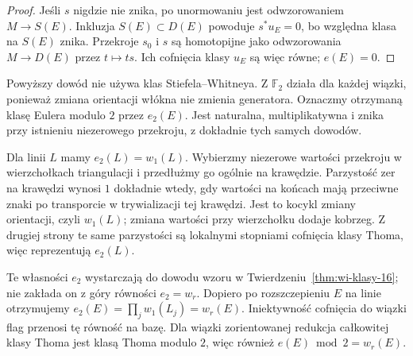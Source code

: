 \begin{proof}
Jeśli $s$ nigdzie
nie znika, po unormowaniu
jest odwzorowaniem
$M\to S(E)$.
Inkluzja $S(E)\subset D(E)$
powoduje $s^*u_E=0$,
bo względna klasa
na $S(E)$ znika.
Przekroje $s_0$ i $s$
są homotopijne jako
odwzorowania $M\to D(E)$
przez $t\mapsto ts$.
Ich cofnięcia klasy
$u_E$ są więc równe;
$e(E)=0$.
\end{proof}

\begin{uwaga}
Powyższy dowód nie używa klas Stiefela--Whitneya.
Z $\mathbb F_2$ działa dla każdej wiązki, ponieważ
zmiana orientacji włókna nie zmienia generatora.
Oznaczmy otrzymaną klasę Eulera modulo $2$ przez $e_2(E)$.
Jest naturalna, multiplikatywna i znika przy istnieniu
niezerowego przekroju, z dokładnie tych samych dowodów.

Dla linii $L$ mamy $e_2(L)=w_1(L)$. Wybierzmy
niezerowe wartości przekroju w wierzchołkach triangulacji
i przedłużmy go ogólnie na krawędzie. Parzystość zer
na krawędzi wynosi $1$ dokładnie wtedy, gdy wartości
na końcach mają przeciwne znaki po transporcie
w trywializacji tej krawędzi. Jest to kocykl zmiany
orientacji, czyli $w_1(L)$; zmiana wartości przy
wierzchołku dodaje kobrzeg. Z drugiej strony te same
parzystości są lokalnymi stopniami cofnięcia klasy Thoma,
więc reprezentują $e_2(L)$.

Te własności $e_2$ wystarczają do dowodu wzoru
w Twierdzeniu~\ref{thm:wi-klasy-16}; nie zakłada on
z góry równości $e_2=w_r$. Dopiero po rozszczepieniu
$E$ na linie otrzymujemy
$e_2(E)=\prod_jw_1(L_j)=w_r(E)$.
Iniektywność cofnięcia do wiązki flag przenosi
tę równość na bazę. Dla wiązki zorientowanej
redukcja całkowitej klasy Thoma jest klasą Thoma modulo $2$,
więc również $e(E)\bmod2=w_r(E)$.
\end{uwaga}

